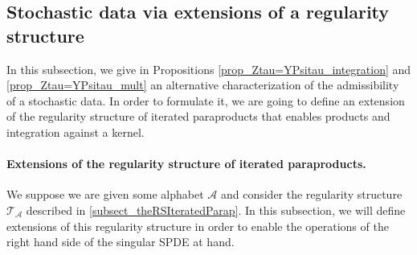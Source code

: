 \documentclass[11pt]{preprint}
\newcommand{\mcA}{\mathcal{A}}
\newcommand{\scrT}{\mathscr{T}}
\begin{document}
\subsection{Stochastic data via extensions of a regularity structure}

In this subsection, we give in Propositions \ref{prop_Ztau=YPsitau_integration} and \ref{prop_Ztau=YPsitau_mult} an alternative characterization of the admissibility of a stochastic data. In order to formulate it, we are going to define an extension of the regularity structure of iterated  paraproducts that enables products and integration against a kernel.

\paragraph{ Extensions of the regularity structure of iterated paraproducts.  }


We suppose we are given some alphabet $\mcA$ and consider the regularity structure $\scrT_\mcA$ described in \ref{subsect_theRSIteratedParap}. In this subsection, we will define extensions of this regularity structure in order to enable the operations of the right hand side of the singular SPDE at hand.
\end{document}
